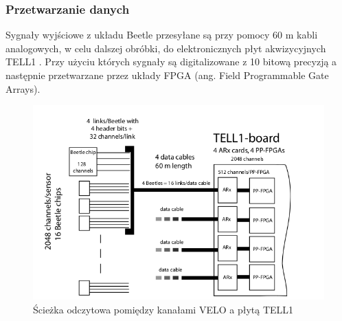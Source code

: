 \subsubsection{Przetwarzanie danych}
Sygnały wyjściowe z układu Beetle przesyłane są przy pomocy 60 m kabli analogowych, w celu dalszej obróbki, do elektronicznych płyt akwizycyjnych TELL1 \cite{Aras}. Przy użyciu których sygnały są digitalizowane z 10 bitową precyzją a następnie przetwarzane przez układy FPGA (ang. Field Programmable Gate Arrays). 
\begin{figure}[ht]
 \centering
 \includegraphics[scale=0.9]{rozdzial2/Velo_schematic.png}
 \caption{Ścieżka odczytowa pomiędzy kanałami VELO a płytą TELL1\cite{Aras}}
\end{figure}





